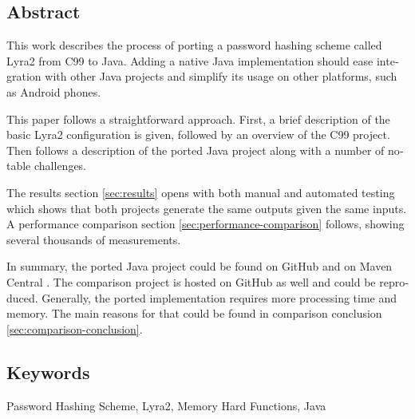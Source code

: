 \cleardoublepage
{}

\begin{otherlanguage}{english}
\chapter*{Abstract}

This work describes the process of porting a password hashing scheme called Lyra2 from C99 to Java. Adding a native Java implementation should ease integration with other Java projects and simplify its usage on other platforms, such as Android phones.

This paper follows a straightforward approach. First, a brief description of the basic Lyra2 configuration is given, followed by an overview of the C99 project. Then follows a description of the ported Java project along with a number of notable challenges.

The results section \ref{sec:results} opens with both manual and automated testing which shows that both projects generate the same outputs given the same inputs. A performance comparison section \ref{sec:performance-comparison} follows, showing several thousands of measurements.

In summary, the ported Java project could be found on GitHub \cite{github:2017:lyra2-java} and on Maven Central \cite{maven:2017:lyra2}. The comparison project is hosted on GitHub as well \cite{github:2017:lyra2-compare} and could be reproduced. Generally, the ported implementation requires more processing time and memory. The main reasons for that could be found in comparison conclusion \ref{sec:comparison-conclusion}.

\bigskip

\section*{Keywords}
Password Hashing Scheme, Lyra2, Memory Hard Functions, Java

\end{otherlanguage}
